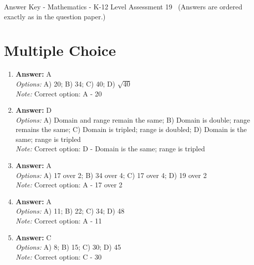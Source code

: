 \documentclass[12pt]{article}
\begin{document}
\begin{center}
Answer Key - Mathematics - K-12 Level Assessment 19 \
\small (Answers are ordered exactly as in the question paper.)
\end{center}

\section*{Multiple Choice}
\begin{enumerate}[label=\arabic*.]
\item \textbf{Answer:} A
\\ \textit{Options:} A) 20; B) 34; C) 40; D) \ensuremath{\sqrt{40}}
\\ \textit{Note:} Correct option: A - 20
\item \textbf{Answer:} D
\\ \textit{Options:} A) Domain and range remain the same; B) Domain is double; range remains the same; C) Domain is tripled; range is doubled; D) Domain is the same; range is tripled
\\ \textit{Note:} Correct option: D - Domain is the same; range is tripled
\item \textbf{Answer:} A
\\ \textit{Options:} A) 17 over 2; B) 34 over 4; C) 17 over 4; D) 19 over 2
\\ \textit{Note:} Correct option: A - 17 over 2
\item \textbf{Answer:} A
\\ \textit{Options:} A) 11; B) 22; C) 34; D) 48
\\ \textit{Note:} Correct option: A - 11
\item \textbf{Answer:} C
\\ \textit{Options:} A) 8; B) 15; C) 30; D) 45
\\ \textit{Note:} Correct option: C - 30
\end{enumerate}
\end{document}
